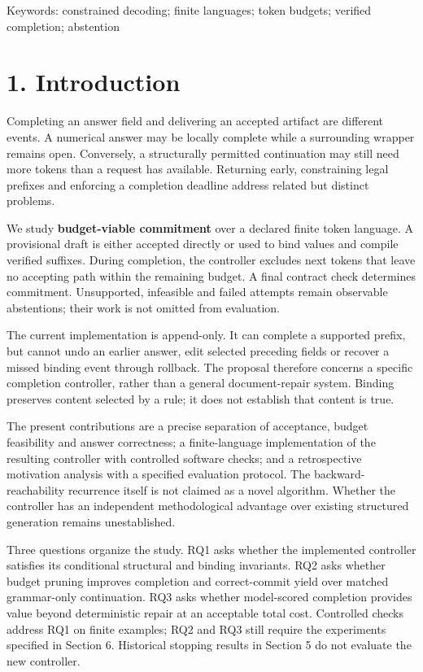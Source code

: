 \documentclass[
  12pt,
  a4paper,
]{article}
\begin{document}
Keywords: constrained decoding; finite languages; token budgets;
verified completion; abstention

\section{1. Introduction}\label{introduction}

Completing an answer field and delivering an accepted artifact are
different events. A numerical answer may be locally complete while a
surrounding wrapper remains open. Conversely, a structurally permitted
continuation may still need more tokens than a request has available.
Returning early, constraining legal prefixes and enforcing a completion
deadline address related but distinct problems.

We study \textbf{budget-viable commitment} over a declared finite token
language. A provisional draft is either accepted directly or used to
bind values and compile verified suffixes. During completion, the
controller excludes next tokens that leave no accepting path within the
remaining budget. A final contract check determines commitment.
Unsupported, infeasible and failed attempts remain observable
abstentions; their work is not omitted from evaluation.

The current implementation is append-only. It can complete a supported
prefix, but cannot undo an earlier answer, edit selected preceding
fields or recover a missed binding event through rollback. The proposal
therefore concerns a specific completion controller, rather than a
general document-repair system. Binding preserves content selected by a
rule; it does not establish that content is true.

The present contributions are a precise separation of acceptance, budget
feasibility and answer correctness; a finite-language implementation of
the resulting controller with controlled software checks; and a
retrospective motivation analysis with a specified evaluation protocol.
The backward-reachability recurrence itself is not claimed as a novel
algorithm. Whether the controller has an independent methodological
advantage over existing structured generation remains unestablished.

Three questions organize the study. RQ1 asks whether the implemented
controller satisfies its conditional structural and binding invariants.
RQ2 asks whether budget pruning improves completion and correct-commit
yield over matched grammar-only continuation. RQ3 asks whether
model-scored completion provides value beyond deterministic repair at an
acceptable total cost. Controlled checks address RQ1 on finite examples;
RQ2 and RQ3 still require the experiments specified in Section 6.
Historical stopping results in Section 5 do not evaluate the new
controller.
\end{document}
